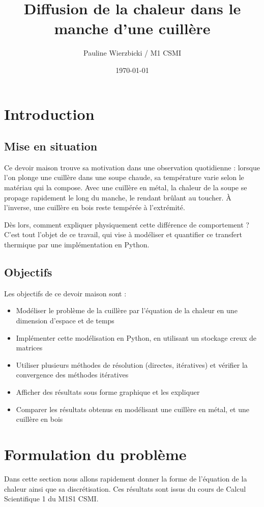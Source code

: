 \documentclass[11pt,a4paper]{article}
\title{Diffusion de la chaleur dans le manche d'une cuillère}
\author{Pauline Wierzbicki / M1 CSMI}
\date{\today}
\begin{document}
\maketitle

\tableofcontents
\clearpage

\section{Introduction}
\label{sec:introduction}
\subsection{Mise en situation}
Ce devoir maison trouve sa motivation dans une observation quotidienne : 
lorsque l'on plonge une cuillère dans une soupe chaude, sa température varie selon le matériau qui la compose.
Avec une cuillère en métal, la chaleur de la soupe se propage rapidement le long du manche, le rendant brûlant au toucher.
À l'inverse, une cuillère en bois reste tempérée à l'extrémité.

Dès lors, comment expliquer physiquement cette différence de comportement ?
C'est tout l'objet de ce travail, qui vise à modéliser et quantifier ce transfert thermique par une implémentation en Python.

\subsection{Objectifs}
Les objectifs de ce devoir maison sont :

\begin{itemize}
  \item Modéliser le problème de la cuillère par l'équation de la chaleur en une dimension d'espace et de temps
  \item Implémenter cette modélisation en Python, en utilisant un stockage creux de matrices
  \item Utiliser plusieurs méthodes de résolution (directes, itératives) et vérifier la convergence des méthodes itératives
  \item Afficher des résultats sous forme graphique et les expliquer
  \item Comparer les résultats obtenus en modélisant une cuillère en métal, et une cuillère en bois
\end{itemize}

\section{Formulation du problème}
\label{sec:formulation_mathematique}
Dans cette section nous allons rapidement donner la forme de l'équation de la chaleur ainsi que sa discrétisation.
Ces résultats sont issus du cours de Calcul Scientifique 1 du M1S1 CSMI.
\end{document}
